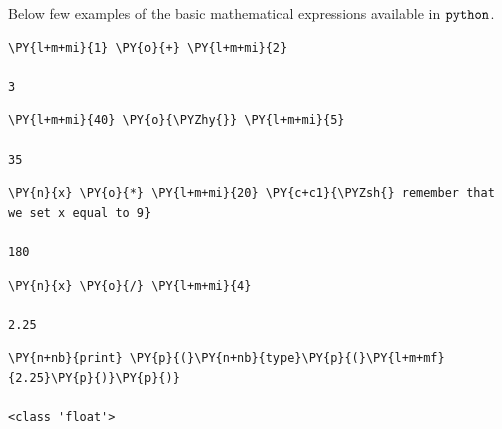 Below few examples of the basic mathematical expressions available in $\tt{python}$.

\begin{tcolorbox}[breakable, size=fbox, boxrule=1pt, pad at break*=1mm, colback=cellbackground, colframe=cellborder]            
\begin{Verbatim}[commandchars=\\\{\}]
\PY{l+m+mi}{1} \PY{o}{+} \PY{l+m+mi}{2}

3
\end{Verbatim}
\end{tcolorbox}

\begin{tcolorbox}[breakable, size=fbox, boxrule=1pt, pad at break*=1mm, colback=cellbackground, colframe=cellborder]            
\begin{Verbatim}[commandchars=\\\{\}]
\PY{l+m+mi}{40} \PY{o}{\PYZhy{}} \PY{l+m+mi}{5}

35
\end{Verbatim}
\end{tcolorbox}

\begin{tcolorbox}[breakable, size=fbox, boxrule=1pt, pad at break*=1mm, colback=cellbackground, colframe=cellborder]            
\begin{Verbatim}[commandchars=\\\{\}]
\PY{n}{x} \PY{o}{*} \PY{l+m+mi}{20} \PY{c+c1}{\PYZsh{} remember that we set x equal to 9}

180
\end{Verbatim}
\end{tcolorbox}

\begin{tcolorbox}[breakable, size=fbox, boxrule=1pt, pad at break*=1mm, colback=cellbackground, colframe=cellborder]            
\begin{Verbatim}[commandchars=\\\{\}]
\PY{n}{x} \PY{o}{/} \PY{l+m+mi}{4}

2.25
\end{Verbatim}
\end{tcolorbox}

\begin{tcolorbox}[breakable, size=fbox, boxrule=1pt, pad at break*=1mm, colback=cellbackground, colframe=cellborder]            
\begin{Verbatim}[commandchars=\\\{\}]
\PY{n+nb}{print} \PY{p}{(}\PY{n+nb}{type}\PY{p}{(}\PY{l+m+mf}{2.25}\PY{p}{)}\PY{p}{)}

<class 'float'>
\end{Verbatim}
\end{tcolorbox}

